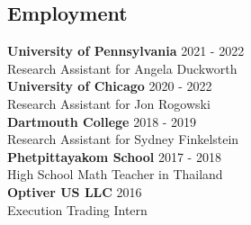 \documentclass[margin,line,pifont,palatino,courier, 9pt]{res}
\begin{document}
\begin{resume}
\section{\sc Employment}
\textbf{University of Pennsylvania} \hfill 2021 - 2022 \\
Research Assistant for Angela Duckworth \vspace{2mm}\\
\textbf{University of Chicago} \hfill 2020 - 2022\\
Research Assistant for Jon Rogowski \vspace{2mm}\\
\textbf{Dartmouth College} \hfill 2018 - 2019 \\
Research Assistant for Sydney Finkelstein \vspace{2mm}\\
\textbf{Phetpittayakom School} \hfill 2017 - 2018 \\
High School Math Teacher in Thailand \vspace{2mm}\\ 
\textbf{Optiver US LLC} \hfill 2016 \\
Execution Trading Intern

\end{resume}
\end{document}
